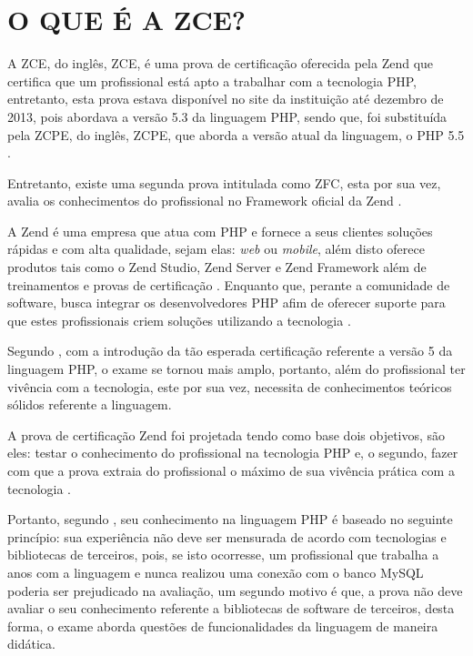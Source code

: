\chapter{O QUE É A ZCE?}
\label{zce}

A \acs{ZCE}, do inglês, \acl{ZCE}, é uma prova de certificação oferecida
pela Zend que certifica que um profissional está apto a trabalhar com a
tecnologia \acs{PHP}, entretanto, esta prova estava disponível no site da
instituição até dezembro de 2013, pois abordava a versão 5.3 da
linguagem \acs{PHP}, sendo que, foi substituída pela \acs{ZCPE}, do inglês, \acl{ZCPE},
que aborda a versão atual da linguagem, o PHP 5.5  \cite{websiteZendZCE}. 

Entretanto, existe uma segunda prova intitulada como \ac{ZFC},
esta por sua vez, avalia os conhecimentos do profissional no
Framework oficial da Zend \cite{websiteZendZFC}.

A Zend é uma empresa que atua com \acs{PHP} e fornece a seus clientes soluções 
rápidas e com alta qualidade, sejam elas: \textit{web} ou \textit{mobile}, além
disto oferece produtos tais como o \acs{Zend Studio}, \acs{Zend Server} e 
\acs{Zend Framework} além de treinamentos e provas de certificação 
\cite{websiteZendCompany}. Enquanto que, perante a comunidade de software, busca
integrar os desenvolvedores \acs{PHP} afim de oferecer suporte para que estes 
profissionais criem soluções utilizando a tecnologia \cite{websiteZendCompany}.

Segundo , com a introdução da tão
esperada certificação referente a versão 5 da linguagem \acs{PHP}, o exame se
tornou mais amplo, portanto, além do profissional ter vivência com a
tecnologia, este por sua vez, necessita de conhecimentos teóricos sólidos
referente a linguagem.

A prova de certificação Zend foi projetada tendo como base dois objetivos, são
eles: testar o conhecimento do profissional na tecnologia \acs{PHP} e, o
segundo, fazer com que a prova extraia do profissional o máximo de sua vivência 
prática com a tecnologia \cite{theZendPHPCertificationPracticeTestBook}.

Portanto, segundo , seu
conhecimento na linguagem \acs{PHP} é baseado no seguinte princípio: sua
experiência não deve ser mensurada de acordo com tecnologias
e bibliotecas de terceiros, pois, se isto ocorresse, um profissional que
trabalha a anos com a linguagem e nunca realizou uma conexão com o banco 
\acs{MySQL} poderia ser prejudicado na avaliação, um segundo motivo é que, a
prova não deve avaliar o seu conhecimento referente a bibliotecas de software
de terceiros, desta forma, o exame aborda questões de funcionalidades da 
linguagem  de maneira didática.

